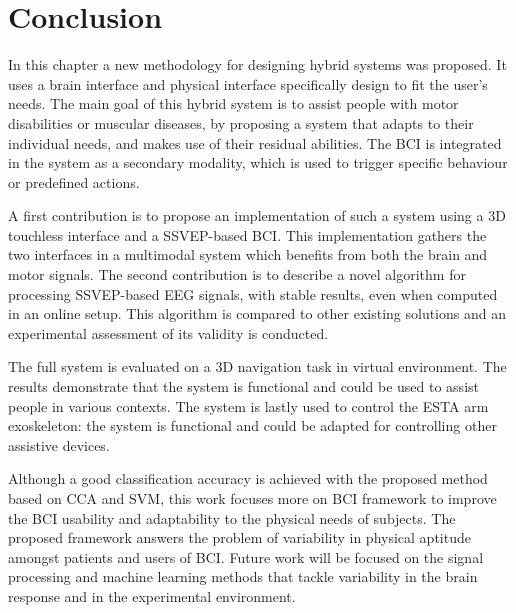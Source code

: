 

\section{Conclusion}
\label{hBCI-conclusion}

In this chapter a new methodology for designing hybrid systems was proposed. It uses a brain interface and physical interface specifically design to fit the user's needs. 
The main goal of this hybrid system is to assist people with motor disabilities or muscular diseases, by proposing a system that adapts to their individual needs, and makes use of their residual abilities.
The BCI is integrated in the system as a secondary modality, which is used to trigger specific behaviour or predefined actions.

A first contribution is to propose an implementation of such a system using a 3D touchless interface and a SSVEP-based BCI.
This implementation gathers the two interfaces in a multimodal system which benefits from both the brain and motor signals.
The second contribution is to describe a novel algorithm for processing SSVEP-based EEG signals, with stable results, even when computed in an online setup.
This algorithm is compared to other existing solutions and an experimental assessment of its validity is conducted.

The full system is evaluated on a 3D  navigation task in virtual environment. 
The results demonstrate that the system is functional and could be used to assist people in various contexts.
The system is lastly used to control the ESTA arm exoskeleton: the system is functional and could be adapted for controlling other  assistive devices.

Although a good classification accuracy is achieved with the proposed method based on CCA and SVM, this work focuses more on BCI framework to improve the BCI usability and adaptability to the physical needs of subjects. The proposed framework answers the problem of variability in physical aptitude amongst patients and users of BCI.
Future work will be focused on the signal processing and machine learning methods that tackle variability in the brain response and in the experimental environment. 
